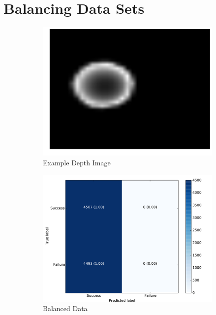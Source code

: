 
\section{Balancing Data Sets}
\label{sec:balance}

\begin{figure}[t!]
    \begin{subfigure}[t]{0.24\textwidth}
        \includegraphics[width=0.75\columnwidth]{figs/depth_example.pdf} \caption{Example Depth Image} \label{fig:depth_image}
        \end{subfigure}
    \begin{subfigure}[t]{0.24\textwidth}
        \includegraphics[width=0.9\columnwidth]{figs/balanced_results.pdf} \caption{Balanced Data} \label{fig:balanced_confusion}
    \end{subfigure}
		\begin{subfigure}[t]{0.24\textwidth}

\end{subfigure}
\end{figure}
